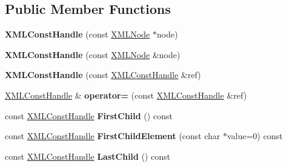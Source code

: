 \subsection*{Public Member Functions}
\begin{DoxyCompactItemize}
\item 
\hypertarget{classtinyxml2_1_1_x_m_l_const_handle_a098bda71fa11d7c74ccddab59d5dd534}{}{\bfseries X\+M\+L\+Const\+Handle} (const \hyperlink{classtinyxml2_1_1_x_m_l_node}{X\+M\+L\+Node} $\ast$node)\label{classtinyxml2_1_1_x_m_l_const_handle_a098bda71fa11d7c74ccddab59d5dd534}

\item 
\hypertarget{classtinyxml2_1_1_x_m_l_const_handle_a8420a0c4720637e0529e78c2e22f2b0b}{}{\bfseries X\+M\+L\+Const\+Handle} (const \hyperlink{classtinyxml2_1_1_x_m_l_node}{X\+M\+L\+Node} \&node)\label{classtinyxml2_1_1_x_m_l_const_handle_a8420a0c4720637e0529e78c2e22f2b0b}

\item 
\hypertarget{classtinyxml2_1_1_x_m_l_const_handle_a639317ad315ff24f4ef0dc69312d7303}{}{\bfseries X\+M\+L\+Const\+Handle} (const \hyperlink{classtinyxml2_1_1_x_m_l_const_handle}{X\+M\+L\+Const\+Handle} \&ref)\label{classtinyxml2_1_1_x_m_l_const_handle_a639317ad315ff24f4ef0dc69312d7303}

\item 
\hypertarget{classtinyxml2_1_1_x_m_l_const_handle_a2d74c91df1ff9aa5f9b57e3dceddbf94}{}\hyperlink{classtinyxml2_1_1_x_m_l_const_handle}{X\+M\+L\+Const\+Handle} \& {\bfseries operator=} (const \hyperlink{classtinyxml2_1_1_x_m_l_const_handle}{X\+M\+L\+Const\+Handle} \&ref)\label{classtinyxml2_1_1_x_m_l_const_handle_a2d74c91df1ff9aa5f9b57e3dceddbf94}

\item 
\hypertarget{classtinyxml2_1_1_x_m_l_const_handle_a64c4ff7074effc1fd181d68d23f9d1e4}{}const \hyperlink{classtinyxml2_1_1_x_m_l_const_handle}{X\+M\+L\+Const\+Handle} {\bfseries First\+Child} () const \label{classtinyxml2_1_1_x_m_l_const_handle_a64c4ff7074effc1fd181d68d23f9d1e4}

\item 
\hypertarget{classtinyxml2_1_1_x_m_l_const_handle_a5c197d0b57f8e560d93356a4a281469c}{}const \hyperlink{classtinyxml2_1_1_x_m_l_const_handle}{X\+M\+L\+Const\+Handle} {\bfseries First\+Child\+Element} (const char $\ast$value=0) const \label{classtinyxml2_1_1_x_m_l_const_handle_a5c197d0b57f8e560d93356a4a281469c}

\item 
\hypertarget{classtinyxml2_1_1_x_m_l_const_handle_afec9a68e7951193bc5a6e876d602f263}{}const \hyperlink{classtinyxml2_1_1_x_m_l_const_handle}{X\+M\+L\+Const\+Handle} {\bfseries Last\+Child} () const \label{classtinyxml2_1_1_x_m_l_const_handle_afec9a68e7951193bc5a6e876d602f263}


\end{DoxyCompactItemize}
